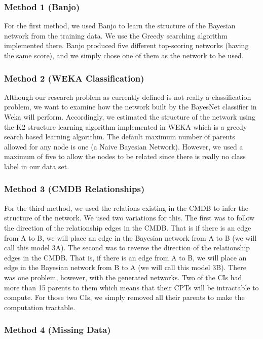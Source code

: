 \documentclass{article}
\begin{document}
\subsubsection{Method 1 (Banjo)}
\label{sec:model1}

For the first method, we used Banjo to learn the structure of the Bayesian network from the training data. We use the Greedy searching algorithm implemented
there. Banjo produced five different top-scoring networks (having the same score), and we simply chose one of them as the network to be used.

\subsubsection{Method 2 (WEKA Classification)}

Although our research problem as currently defined is not really a classification problem, we want to examine how the network built by the BayesNet classifier
in Weka will perform. Accordingly, we estimated the structure of the network using the K2 structure learning algorithm implemented in WEKA which is a greedy
search based learning algorithm. The default maximum number of parents allowed for any node is one (a Naive Bayesian Network). However, we used a maximum of
five to allow the nodes to be related since there is really no class label in our data set.

\subsubsection{Method 3 (CMDB Relationships)}

For the third method, we used the relations existing in the CMDB to infer the structure of the network. We used two
variations for this. The first was to follow the direction of the relationship edges in the CMDB. That is if there is an edge from A to B, we will place an
edge in the Bayesian network from A to B (we will call this model 3A). The second was to reverse the direction of the relationship edges in the CMDB. That is,
if there is an edge from A to B, we will place an edge in the Bayesian network from B to A (we will call this model 3B). There was one problem, however, with
the generated networks. Two of the CIs had more than 15 parents to them which means that their CPTs will be intractable to compute. For those two CIs, we simply
removed all their parents to make the computation tractable.

\subsubsection{Method 4 (Missing Data)}
\end{document}
